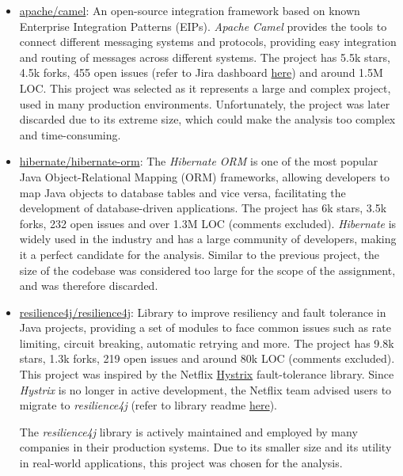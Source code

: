 \begin{itemize}
	\item \href{https://github.com/apache/camel}{apache/camel}: An open-source integration framework based on known Enterprise Integration Patterns (EIPs). \cite{camel:description} \textit{Apache Camel} provides the tools to connect different messaging systems and protocols, providing easy integration and routing of messages across different systems. The project has 5.5k stars, 4.5k forks, 455 open issues (refer to Jira dashboard \href{https://issues.apache.org/jira/projects/CAMEL/issues/CAMEL-21410?filter=allopenissues}{here}) and around 1.5M LOC. This project was selected as it represents a large and complex project, used in many production environments.
	      Unfortunately, the project was later discarded due to its extreme size, which could make the analysis too complex and time-consuming.

	\item \href{https://github.com/hibernate/hibernate-orm}{hibernate/hibernate-orm}: The \textit{Hibernate ORM} is one of the most popular Java Object-Relational Mapping (ORM) frameworks, allowing developers to map Java objects to database tables and vice versa, facilitating the development of database-driven applications. The project has 6k stars, 3.5k forks, 232 open issues and over 1.3M LOC (comments excluded). \textit{Hibernate} is widely used in the industry and has a large community of developers, making it a perfect candidate for the analysis.
	      Similar to the previous project, the size of the codebase was considered too large for the scope of the assignment, and was therefore discarded.

	\item \href{https://github.com/resilience4j/resilience4j}{resilience4j/resilience4j}: Library to improve resiliency and fault tolerance in Java projects, providing a set of modules to face common issues such as rate limiting, circuit breaking, automatic retrying and more. The project has 9.8k stars, 1.3k forks, 219 open issues and around 80k LOC (comments excluded). This project was inspired by the Netflix \href{https://github.com/Netflix/Hystrix}{Hystrix} fault-tolerance library. Since \textit{Hystrix} is no longer in active development, the Netflix team advised users to migrate to \textit{resilience4j} (refer to library readme \href{https://github.com/Netflix/Hystrix?tab=readme-ov-file#hystrix-status}{here}).

	      The \textit{resilience4j} library is actively maintained and employed by many companies in their production systems. Due to its smaller size and its utility in real-world applications, this project was chosen for the analysis.

\end{itemize}

